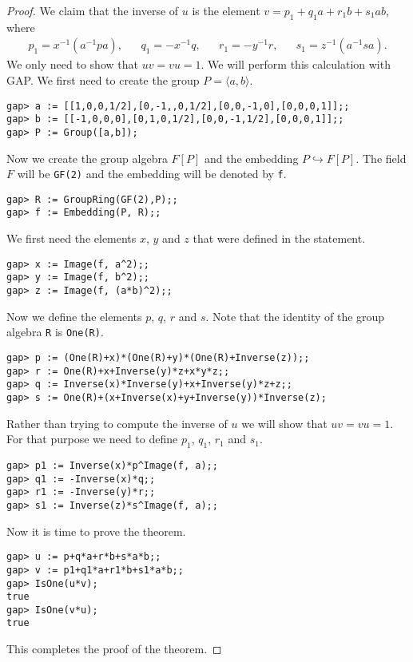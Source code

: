 \begin{proof}
    We claim that the inverse of $u$ 
    is the element $v=p_1+q_1a+r_1b+s_1ab$, where
    \begin{align*}
        p_1=x^{-1}(a^{-1}pa), 
        && q_1=-x^{-1}q,
        && r_1=-y^{-1}r,
        && s_1=z^{-1}(a^{-1}sa).
    \end{align*}
    We only need to show that $uv=vu=1$. We will perform this
    calculation with \textsf{GAP}. 
    We first need to create the group $P=\langle a,b\rangle$. 
\begin{lstlisting} 
gap> a := [[1,0,0,1/2],[0,-1,,0,1/2],[0,0,-1,0],[0,0,0,1]];;
gap> b := [[-1,0,0,0],[0,1,0,1/2],[0,0,-1,1/2],[0,0,0,1]];;
gap> P := Group([a,b]);
\end{lstlisting}
    Now we create the group algebra $F[P]$ and 
    the embedding $P\hookrightarrow F[P]$.  
    The field $F$ will be \lstinline{GF(2)} 
    and the embedding will be denoted by \lstinline{f}. 
\begin{lstlisting}
gap> R := GroupRing(GF(2),P);;
gap> f := Embedding(P, R);;
\end{lstlisting}
    We first need the elements $x$, $y$ and $z$ that were defined in the
    statement.
\begin{lstlisting}
gap> x := Image(f, a^2);;
gap> y := Image(f, b^2);;
gap> z := Image(f, (a*b)^2);;
\end{lstlisting}
    Now we define the elements $p$, $q$, $r$ and $s$. Note that
    the identity of the group algebra \lstinline{R} 
    is \lstinline{One(R)}. 
\begin{lstlisting}
gap> p := (One(R)+x)*(One(R)+y)*(One(R)+Inverse(z));;
gap> r := One(R)+x+Inverse(y)*z+x*y*z;;
gap> q := Inverse(x)*Inverse(y)+x+Inverse(y)*z+z;;
gap> s := One(R)+(x+Inverse(x)+y+Inverse(y))*Inverse(z);
\end{lstlisting}
    Rather than trying 
    to compute the inverse of $u$ we will show that 
    $uv=vu=1$. For that purpose we need to define
    $p_1$, $q_1$, $r_1$ and $s_1$.
\begin{lstlisting}
gap> p1 := Inverse(x)*p^Image(f, a);;
gap> q1 := -Inverse(x)*q;;
gap> r1 := -Inverse(y)*r;;
gap> s1 := Inverse(z)*s^Image(f, a);;
\end{lstlisting}
Now it is time to prove the theorem. 
\begin{lstlisting}
gap> u := p+q*a+r*b+s*a*b;;
gap> v := p1+q1*a+r1*b+s1*a*b;;
gap> IsOne(u*v);
true
gap> IsOne(v*u);
true
\end{lstlisting}
This completes the proof of the theorem. 
\end{proof}

